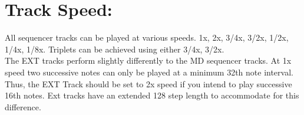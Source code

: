 \vspace{-0.3cm}

\section{Track Speed:}
All sequencer tracks can be played at various speeds. 1x, 2x, 3/4x, 3/2x, 1/2x, 1/4x, 1/8x. Triplets can be achieved using either 3/4x, 3/2x.\\

The EXT tracks perform slightly differently to the MD sequencer tracks. At 1x speed two successive notes can only be played at a minimum 32th note interval. Thus, the EXT Track should be set to 2x speed if you intend to play successive 16th notes. Ext tracks have an extended 128 step length to accommodate for this difference.

\vspace{-0.3cm}
